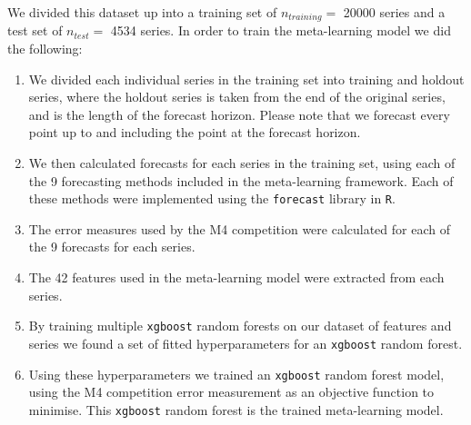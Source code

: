 \documentclass[a4paper,12pt]{article}
\theoremstyle{definition}
\begin{document}
We divided this dataset up into a training set of $n_{training} = $ \num[group-separator={,}]{20000} series and a test set of $n_{test} = $ \num[group-separator={,}]{4534} series. In order to train the meta-learning model we did the following: 
\begin{enumerate}
	\item We divided each individual series in the training set into training and holdout series, where the holdout series is taken from the end of the original series, and is the length of the forecast horizon. Please note that we forecast every point up to and including the point at the forecast horizon.
	\item We then calculated forecasts for each series in the training set, using each of the 9 forecasting methods included in the meta-learning framework. Each of these methods were implemented using the \texttt{forecast} library in \texttt{R}.
	\item The error measures used by the M4 competition were calculated for each of the 9 forecasts for each series.
	\item The 42 features used in the meta-learning model were extracted from each series.
	\item By training multiple \texttt{xgboost} random forests on our dataset of features and series we found a set of fitted hyperparameters for an \texttt{xgboost} random forest.
	\item Using these hyperparameters we trained an \texttt{xgboost} random forest model, using the M4 competition error measurement as an objective function to minimise. This \texttt{xgboost} random forest is the trained meta-learning model.
\end{enumerate}
\end{document}
